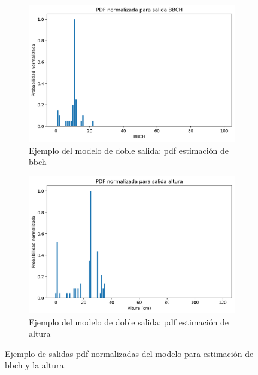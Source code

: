 \begin{figure}[H]
\centering
\begin{subfigure}{0.6\textwidth}
  \centering
  \includegraphics[width=0.95\linewidth]{archivos/tfg/Mean/TEST_PARC_PDF}
  \caption{Ejemplo del modelo de doble salida: \gls{pdf} estimación de \gls{bbch}\label{fig:pdf_b}}
\end{subfigure}
\begin{subfigure}{0.6\textwidth}
  \centering
  \includegraphics[width=0.95\linewidth]{archivos/tfg/Mean/TEST_PARC_PDF_H}
  \caption{Ejemplo del modelo de doble salida: \gls{pdf} estimación de altura\label{fig:pdf_h}}
\end{subfigure}
\caption{Ejemplo de salidas \gls{pdf} normalizadas del modelo para estimación de \gls{bbch} y la altura. \label{fig:pdf_bh}}
\end{figure}
